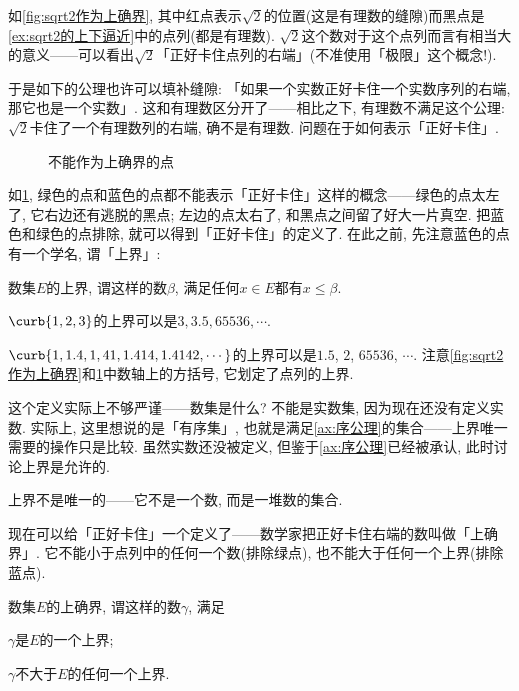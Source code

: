 \documentclass[hidelinks]{ctexart}
\begin{document}
如\cref{fig:sqrt2作为上确界}, 其中红点表示$\sqrt{2}$的位置(这是有理数的缝隙)而黑点是\cref{ex:sqrt2的上下逼近}中的点列(都是有理数). $\sqrt{2}$这个数对于这个点列而言有相当大的意义——可以看出$\sqrt{2}$「正好卡住点列的右端」(不准使用「极限」这个概念!).
\par
于是如下的公理也许可以填补缝隙: 「如果一个实数正好卡住一个实数序列的右端, 那它也是一个实数」. 这和有理数区分开了——相比之下, 有理数不满足这个公理: $\sqrt{2}$卡住了一个有理数列的右端, 确不是有理数. 问题在于如何表示「正好卡住」.

\begin{figure}[h]
    \centering
    \caption{不能作为上确界的点}
    \label{fig:不能作为上确界的点}
\end{figure}

如\cref{fig:不能作为上确界的点}, 绿色的点和蓝色的点都不能表示「正好卡住」这样的概念——绿色的点太左了, 它右边还有逃脱的黑点; 左边的点太右了, 和黑点之间留了好大一片真空. 把蓝色和绿色的点排除, 就可以得到「正好卡住」的定义了. 在此之前, 先注意蓝色的点有一个学名, 谓「上界」:
\begin{definition}[上界]
    数集$E$的上界, 谓这样的数$\beta$, 满足任何$x\in E$都有$x \le \beta$.
\end{definition}
\begin{sample}
    \begin{ex}
        $\curb{1,2,3}$的上界可以是$3, 3.5, 65536, \cdots$. 
    \end{ex}
    \begin{ex}
        \label{ex:有理数列不一定有上确界}
        $\curb{1,1.4,1,41, 1.414, 1.4142, \cdots}$的上界可以是$1.5$, $2$, $65536$, $\cdots$. 注意\cref{fig:sqrt2作为上确界}和\cref{fig:不能作为上确界的点}中数轴上的方括号, 它划定了点列的上界.
    \end{ex}
\end{sample}
\begin{remark}
    这个定义实际上不够严谨——数集是什么? 不能是实数集, 因为现在还没有定义实数. 实际上, 这里想说的是「有序集」, 也就是满足\cref{ax:序公理}的集合——上界唯一需要的操作只是比较. 虽然实数还没被定义, 但鉴于\cref{ax:序公理}已经被承认, 此时讨论上界是允许的.
\end{remark}
\begin{pitfall}
    上界不是唯一的——它不是一个数, 而是一堆数的集合.
\end{pitfall}
现在可以给「正好卡住」一个定义了——数学家把正好卡住右端的数叫做「上确界」. 它不能小于点列中的任何一个数(排除绿点), 也不能大于任何一个上界(排除蓝点).
\begin{definition}[上确界]
    \label{def:上确界}
    数集$E$的上确界, 谓这样的数$\gamma$, 满足
    \begin{cenum}
        \item $\gamma$是$E$的一个上界;
        \item $\gamma$不大于$E$的任何一个上界.
    \end{cenum}
\end{definition}
\end{document}
